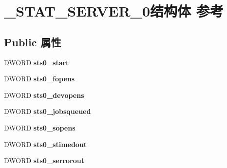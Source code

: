 \hypertarget{struct___s_t_a_t___s_e_r_v_e_r__0}{}\section{\+\_\+\+S\+T\+A\+T\+\_\+\+S\+E\+R\+V\+E\+R\+\_\+0结构体 参考}
\label{struct___s_t_a_t___s_e_r_v_e_r__0}
\subsection*{Public 属性}
\begin{DoxyCompactItemize}
\item 
\mbox{\label{struct___s_t_a_t___s_e_r_v_e_r__0_a88c642d7ae7ae0e53337e30d14da7b4c}} 
D\+W\+O\+RD {\bfseries sts0\+\_\+start}
\item 
\mbox{\label{struct___s_t_a_t___s_e_r_v_e_r__0_af40b843ef160cd7d38d690fbbd91ede1}} 
D\+W\+O\+RD {\bfseries sts0\+\_\+fopens}
\item 
\mbox{\label{struct___s_t_a_t___s_e_r_v_e_r__0_aa4204e66b505ce3312801c7b3d384f6e}} 
D\+W\+O\+RD {\bfseries sts0\+\_\+devopens}
\item 
\mbox{\label{struct___s_t_a_t___s_e_r_v_e_r__0_aa04cd7bbfc6c290a748483c208c3e203}} 
D\+W\+O\+RD {\bfseries sts0\+\_\+jobsqueued}
\item 
\mbox{\label{struct___s_t_a_t___s_e_r_v_e_r__0_a54827040fe0d4bbefcd8c43e4a21e517}} 
D\+W\+O\+RD {\bfseries sts0\+\_\+sopens}
\item 
\mbox{\label{struct___s_t_a_t___s_e_r_v_e_r__0_a83d5d1670b2f80da55eedc3c1de4e0bc}} 
D\+W\+O\+RD {\bfseries sts0\+\_\+stimedout}
\item 
\mbox{\label{struct___s_t_a_t___s_e_r_v_e_r__0_adb66acd6c4d226e4c58893ab929b9aac}} 
D\+W\+O\+RD {\bfseries sts0\+\_\+serrorout}
\item 
\mbox{\label{struct___s_t_a_t___s_e_r_v_e_r__0_a22d51a56b91cffc5f5291af23137e13d}} 

\end{DoxyCompactItemize}
